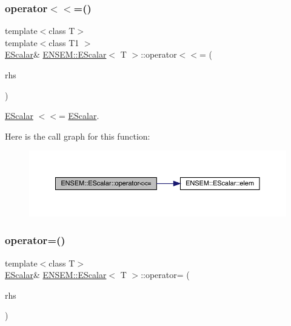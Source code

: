 \subsubsection{\texorpdfstring{operator$<$$<$=()}{operator<<=()}\hspace{0.1cm}{\footnotesize\ttfamily [2/2]}}
{\footnotesize\ttfamily template$<$class T$>$ \\
template$<$class T1 $>$ \\
\mbox{\hyperlink{classENSEM_1_1EScalar}{E\+Scalar}}\& \mbox{\hyperlink{classENSEM_1_1EScalar}{E\+N\+S\+E\+M\+::\+E\+Scalar}}$<$ T $>$\+::operator$<$$<$= (\begin{DoxyParamCaption}\item[{const \mbox{\hyperlink{classENSEM_1_1EScalar}{E\+Scalar}}$<$ T1 $>$ \&}]{rhs }\end{DoxyParamCaption})\hspace{0.3cm}{\ttfamily [inline]}}



\mbox{\hyperlink{classENSEM_1_1EScalar}{E\+Scalar}} $<$$<$= \mbox{\hyperlink{classENSEM_1_1EScalar}{E\+Scalar}}. 

Here is the call graph for this function\+:
\nopagebreak
\begin{figure}[H]
\begin{center}
\leavevmode
\includegraphics[width=350pt]{d0/d82/classENSEM_1_1EScalar_a29ea96dc5698e4541307d65a0f1dfe6e_cgraph}
\end{center}
\end{figure}
\mbox{\label{classENSEM_1_1EScalar_a01ae8ddc1b0d0e4ecd65f5de624faee5}} 
\subsubsection{\texorpdfstring{operator=()}{operator=()}\hspace{0.1cm}{\footnotesize\ttfamily [1/8]}}
{\footnotesize\ttfamily template$<$class T$>$ \\
\mbox{\hyperlink{classENSEM_1_1EScalar}{E\+Scalar}}\& \mbox{\hyperlink{classENSEM_1_1EScalar}{E\+N\+S\+E\+M\+::\+E\+Scalar}}$<$ T $>$\+::operator= (\begin{DoxyParamCaption}\item[{const typename \mbox{\hyperlink{structENSEM_1_1WordType}{Word\+Type}}$<$ T $>$\+::Type\+\_\+t \&}]{rhs }\end{DoxyParamCaption})\hspace{0.3cm}{\ttfamily [inline]}}



